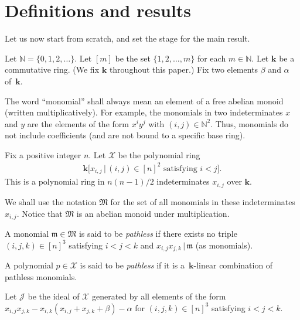 \section{Definitions and results}\label{sect.states}

Let us now start from scratch, and set the stage for the main result.

\begin{Definition}Let $\mathbb{N}=\{ 0,1,2,\ldots\} $. Let $[m] $ be the set $\{ 1,2,\ldots,m\} $ for each $m\in\mathbb{N}$. Let $\mathbf{k}$ be a commutative ring. (We fix $\mathbf{k}$ throughout this paper.) Fix two elements $\beta$ and $\alpha$ of~$\mathbf{k}$.

The word ``monomial'' shall always mean an element of a free abelian monoid (written multiplicatively). For example, the monomials in two indeterminates $x$ and $y$ are the elements of the form $x^{i}y^{j}$ with $(i,j) \in\mathbb{N}^{2}$. Thus, monomials do not include coefficients (and are not bound to a specific base ring).
\end{Definition}

\begin{Definition}Fix a positive integer $n$. Let $\mathcal{X}$ be the polynomial ring
\begin{gather*}
\mathbf{k}\big[ x_{i,j}\,|\, (i,j) \in[n] ^{2}\text{ satisfying }i<j\big] .
\end{gather*}
This is a polynomial ring in $n(n-1) /2$ indeterminates $x_{i,j}$ over $\mathbf{k}$.

We shall use the notation $\mathfrak{M}$ for the set of all monomials in these indeterminates $x_{i,j}$. Notice that $\mathfrak{M}$ is an abelian monoid under multiplication.
\end{Definition}

\begin{Definition} A monomial $\mathfrak{m}\in\mathfrak{M}$ is said to be \textit{pathless} if there exists no triple $(i,j,k) \in[n] ^{3}$ satisfying $i<j<k$ and $x_{i,j}x_{j,k}\,|\,\mathfrak{m}$ (as monomials).

A polynomial $p\in\mathcal{X}$ is said to be \textit{pathless} if it is a~$\mathbf{k}$-linear combination of pathless monomials.
\end{Definition}

\begin{Definition} Let $\mathcal{J}$ be the ideal of $\mathcal{X}$ generated by all elements of the form $x_{i,j}x_{j,k}-x_{i,k} ( x_{i,j}+x_{j,k}+\beta ) -\alpha$ for $(i,j,k) \in[n] ^{3}$ satisfying $i<j<k$.
\end{Definition}

